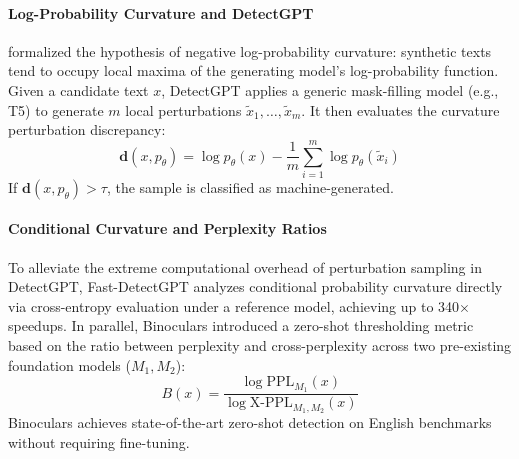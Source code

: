 \paragraph{Log-Probability Curvature and DetectGPT}
\citet{mitchell2023detectgpt} formalized the hypothesis of negative log-probability curvature: synthetic texts tend to occupy local maxima of the generating model's log-probability function. Given a candidate text $x$, DetectGPT applies a generic mask-filling model (e.g., T5) to generate $m$ local perturbations $\tilde{x}_1, \dots, \tilde{x}_m$. It then evaluates the curvature perturbation discrepancy:
\begin{equation}
\label{eq:detectgpt_score}
\mathbf{d}(x, p_\theta) = \log p_\theta(x) - \frac{1}{m} \sum_{i=1}^m \log p_\theta(\tilde{x}_i)
\end{equation}
If $\mathbf{d}(x, p_\theta) > \tau$, the sample is classified as machine-generated. 

\paragraph{Conditional Curvature and Perplexity Ratios}
To alleviate the extreme computational overhead of perturbation sampling in DetectGPT, Fast-DetectGPT \citep{bao2024fastdetectgpt} analyzes conditional probability curvature directly via cross-entropy evaluation under a reference model, achieving up to 340$\times$ speedups. In parallel, Binoculars \citep{hans2024binoculars} introduced a zero-shot thresholding metric based on the ratio between perplexity and cross-perplexity across two pre-existing foundation models ($M_1, M_2$):
\begin{equation}
\label{eq:binoculars_score}
B(x) = \frac{\log \mathrm{PPL}_{M_1}(x)}{\log \mathrm{X}\text{-}\mathrm{PPL}_{M_1, M_2}(x)}
\end{equation}
Binoculars achieves state-of-the-art zero-shot detection on English benchmarks without requiring fine-tuning.

